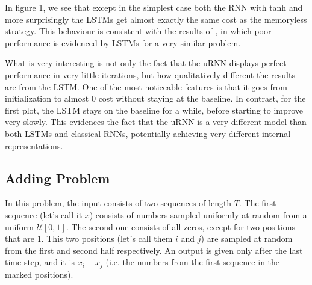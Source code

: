\documentclass{article} %
\begin{document}
In figure 1, we see that except in the simplest case both the RNN with tanh and more surprisingly the LSTMs get almost exactly the same cost as the memoryless strategy. This behaviour is consistent with the results of \cite{NTM}, in which poor performance is evidenced by LSTMs for a very similar problem.

What is very interesting is not only the fact that the uRNN displays perfect performance in very little iterations, but how qualitatively different the results are from the LSTM. One of the most noticeable features is that it goes from initialization to almost 0 cost without staying at the baseline. In contrast, for the first plot, the LSTM stays on the baseline for a while, before starting to improve very slowly. This evidences the fact that the uRNN is a very different model than both LSTMs and classical RNNs, potentially achieving very different internal representations.

\subsection{Adding Problem}
In this problem, the input consists of two sequences of length $T$. The first sequence (let's call it $x$) consists of numbers sampled uniformly at random from a uniform $\mathcal{U}[0,1]$. The second one consists of all zeros, except for two positions that are 1. This two positions (let's call them $i$ and $j$) are sampled at random from the first and second half respectively. An output is given only after the last time step, and it is $x_i + x_j$ (i.e. the numbers from the first sequence in the marked positions).
\end{document}
